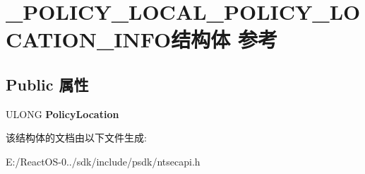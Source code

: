 \hypertarget{struct___p_o_l_i_c_y___l_o_c_a_l___p_o_l_i_c_y___l_o_c_a_t_i_o_n___i_n_f_o}{}\section{\+\_\+\+P\+O\+L\+I\+C\+Y\+\_\+\+L\+O\+C\+A\+L\+\_\+\+P\+O\+L\+I\+C\+Y\+\_\+\+L\+O\+C\+A\+T\+I\+O\+N\+\_\+\+I\+N\+F\+O结构体 参考}
\label{struct___p_o_l_i_c_y___l_o_c_a_l___p_o_l_i_c_y___l_o_c_a_t_i_o_n___i_n_f_o}
\subsection*{Public 属性}
\begin{DoxyCompactItemize}
\item 
\mbox{\label{struct___p_o_l_i_c_y___l_o_c_a_l___p_o_l_i_c_y___l_o_c_a_t_i_o_n___i_n_f_o_a6bfd5b713285d9374786bae1d09d7c05}} 
U\+L\+O\+NG {\bfseries Policy\+Location}
\end{DoxyCompactItemize}


该结构体的文档由以下文件生成\+:\begin{DoxyCompactItemize}
\item 
E\+:/\+React\+O\+S-\/0../sdk/include/psdk/ntsecapi.\+h\end{DoxyCompactItemize}
